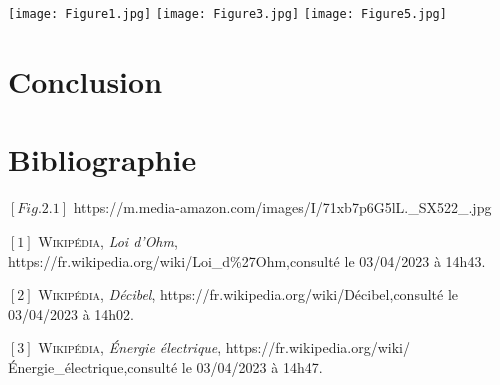 \documentclass[12pt, letterpaper]{report}
\begin{document}
\bigskip

\chapter{}



\chapter{}

\begin{center}
  \texttt{[image: Figure1.jpg]}
  \texttt{[image: Figure3.jpg]}
  \newline
  \texttt{[image: Figure5.jpg]}
\end{center}

\chapter{Conclusion}

\chapter{Bibliographie}

$[Fig.2.1]$ {https://m.media-amazon.com/images/I/71xb7p6G5lL.\_SX522\_.jpg}

$[1]$ \textsc{Wikipédia}, \emph{Loi d'Ohm}, \newline
{https://fr.wikipedia.org/wiki/Loi\_d\%27Ohm},\quad consulté le 03/04/2023 à 14h43.
\smallskip

$[2]$ \textsc{Wikipédia}, \emph{Décibel}, \newline
{https://fr.wikipedia.org/wiki/Décibel},\quad consulté le 03/04/2023 à 14h02.
\smallskip

$[3]$ \textsc{Wikipédia}, \emph{Énergie électrique},\newline
{https://fr.wikipedia.org/wiki/Énergie\_électrique},\quad consulté le 03/04/2023 à 14h47.
\end{document}
